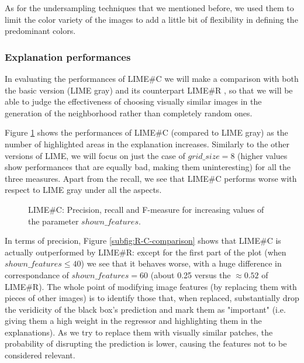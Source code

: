 \documentclass[12pt, twoside, a4paper]{report}
\begin{document}
As for the undersampling techniques that we mentioned before, we used them to limit the color variety of the images to add a little bit of flexibility in defining the predominant colors.


\subsubsection{Explanation performances}

In evaluating the performances of LIME\#C we will make a comparison with both the basic version (LIME gray) and its counterpart LIME\#R , so that we will be able to judge the effectiveness of choosing visually similar images in the generation of the neighborhood rather than completely random ones. 

Figure \ref{subfig:limesharp_C_vs_sf} shows the performances of LIME\#C (compared to LIME gray) as the number of highlighted areas in the explanation increases. Similarly to the other versions of LIME, we will focus on just the case of $grid\_size = 8$ (higher values show performances that are equally bad, making them uninteresting) for all the three measures. Apart from the recall, we see that LIME\#C performs worse with respect to LIME gray under all the aspects.

\begin{figure}
\centering
{}
\caption{LIME\#C: Precision, recall and F-measure for increasing values of the parameter $shown\_features$.}
\label{subfig:limesharp_C_vs_sf}
\end{figure}

In terms of precision, Figure \ref{subfig:R-C-comparison} shows that  LIME\#C is actually outperformed by LIME\#R: except for the first part of the plot (when $shown\_features \leq 40$) we see that it behaves worse, with a huge difference in correspondance of $shown\_features = 60$ (about 0.25 versus the $\approx 0.52$ of LIME\#R). The whole point of modifying image features (by replacing them with pieces of other images) is to identify those that, when replaced, substantially drop the veridicity of the black box's prediction and mark them as "important" (i.e. giving them a high weight in the regressor and highlighting them in the explanations). As we try to replace them with visually similar patches, the probability of disrupting the prediction is lower, causing the features not to be considered relevant.
\end{document}
